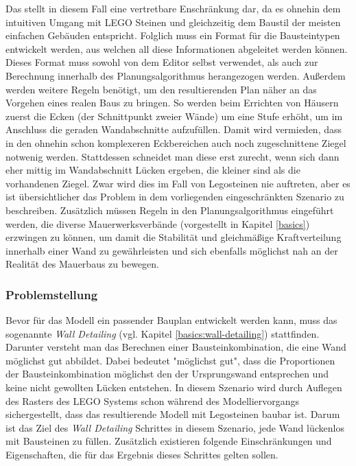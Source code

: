Das stellt in diesem Fall eine vertretbare Enschränkung dar, da es ohnehin dem intuitiven Umgang mit LEGO Steinen und gleichzeitig dem Baustil der meisten einfachen Gebäuden entspricht.
Folglich muss ein Format für die Bausteintypen entwickelt werden, aus welchen all diese Informationen abgeleitet werden können.
Dieses Format muss sowohl von dem Editor selbst verwendet, als auch zur Berechnung innerhalb des Planungsalgorithmus herangezogen werden.
Außerdem werden weitere Regeln benötigt, um den resultierenden Plan näher an das Vorgehen eines realen Baus zu bringen.
So werden beim Errichten von Häusern zuerst die Ecken (der Schnittpunkt zweier Wände) um eine Stufe erhöht, um im Anschluss die geraden Wandabschnitte aufzufüllen.
Damit wird vermieden, dass in den ohnehin schon komplexeren Eckbereichen auch noch zugeschnittene Ziegel notwenig werden.
Stattdessen schneidet man diese erst zurecht, wenn sich dann eher mittig im Wandabschnitt Lücken ergeben, die kleiner sind als die vorhandenen Ziegel.
Zwar wird dies im Fall von Legosteinen nie auftreten, aber es ist übersichtlicher das Problem in dem vorliegenden eingeschränkten Szenario zu beschreiben.
Zusätzlich müssen Regeln in den Planungsalgorithmus eingeführt werden, die diverse Mauerwerksverbände (vorgestellt in Kapitel \ref{basics}) erzwingen zu können, um damit die Stabilität und gleichmäßige Kraftverteilung innerhalb einer Wand zu gewährleisten und sich ebenfalls möglichst nah an der Realität des Mauerbaus zu bewegen.

\subsubsection{Problemstellung}
Bevor für das Modell ein passender Bauplan entwickelt werden kann, muss das sogenannte \textit{Wall Detailing} (vgl. Kapitel \ref{basics:wall-detailing}) stattfinden.
Darunter versteht man das Berechnen einer Bausteinkombination, die eine Wand möglichst gut abbildet.
Dabei bedeutet "möglichst gut", dass die Proportionen der Bausteinkombination möglichst den der Ursprungswand entsprechen und keine nicht gewollten Lücken entstehen.
In diesem Szenario wird durch Auflegen des Rasters des LEGO Systems schon während des Modelliervorgangs sichergestellt, dass das resultierende Modell mit Legosteinen baubar ist.
Darum ist das Ziel des \textit{Wall Detailing} Schrittes in diesem Szenario, jede Wand lückenlos mit Bausteinen zu füllen.
Zusätzlich existieren folgende Einschränkungen und Eigenschaften, die für das Ergebnis dieses Schrittes gelten sollen.

